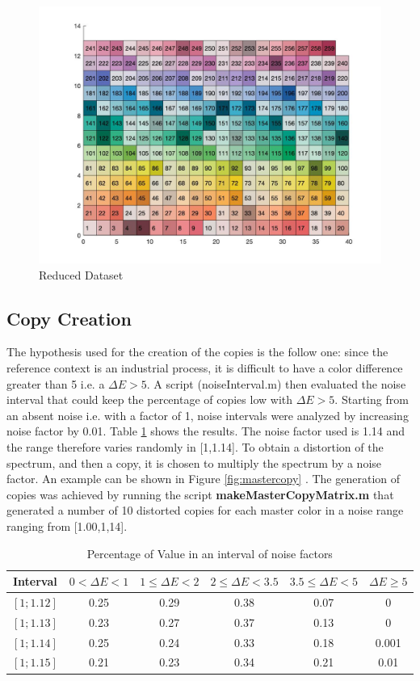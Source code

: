 \documentclass{article}
\begin{document}
\begin{figure}
  \includegraphics[width=\linewidth]{img/reducteddataset.jpg}
  \caption{Reduced Dataset}
  \label{fig:reducteddataset}
\end{figure}
\subsection{Copy Creation} 
The hypothesis used for the creation of the copies is the follow one: since the reference context is an industrial process, it is difficult to have a color difference greater than 5 i.e. a $\Delta E>5$. A script (noiseInterval.m) then evaluated the noise interval that could keep the percentage of copies low with $\Delta E>5$. Starting from an absent noise i.e. with a factor of 1, noise intervals were analyzed by increasing noise factor by 0.01. Table \ref{tab:tablepercentage} shows the results. The noise factor used is 1.14 and the range therefore varies randomly in [1,1.14]. To obtain a distortion of the spectrum, and then a copy, it is chosen to multiply the spectrum by a noise factor. An example can be shown in Figure \ref{fig:mastercopy} . The generation of copies was achieved by running the script \textbf{makeMasterCopyMatrix.m} that generated a number of 10 distorted copies for each master color in a noise range ranging from [1.00,1,14].
\begin{table}[h!]
  \begin{center}
    \label{tab:tablepercentage}
    \begin{tabular}{c|c|c|c|c|c} 
      \textbf{Interval} & \textbf{$0<\Delta E<1$} & \textbf{$1\leq\Delta E<2$}&\textbf{$2\leq\Delta E<3.5$}&\textbf{$3.5\leq\Delta E<5$}&\textbf{$\Delta E\geq5$}\\
       \hline
      $[1;1.12]$ & 0.25	 &0.29	&0.38	&0.07	& 0\\
      $[1;1.13]$ & 0.23 &	0.27 &	0.37 &	0.13 & 	0\\
      $[1;1.14]$ & 0.25 & 0.24 & 	0.33 &	0.18 &	0.001\\
      $[1;1.15]$ & 0.21 &	0.23 &	0.34 &	0.21 &	0.01\\
    \end{tabular}
    \caption{Percentage of Value in an interval of noise factors}
  \end{center}
\end{table}
\end{document}
